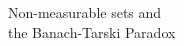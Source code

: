 \documentclass[preview]{standalone}
\begin{document}
\begin{center}
Non-measurable sets and \\ the Banach-Tarski Paradox
\end{center}
\end{document}
